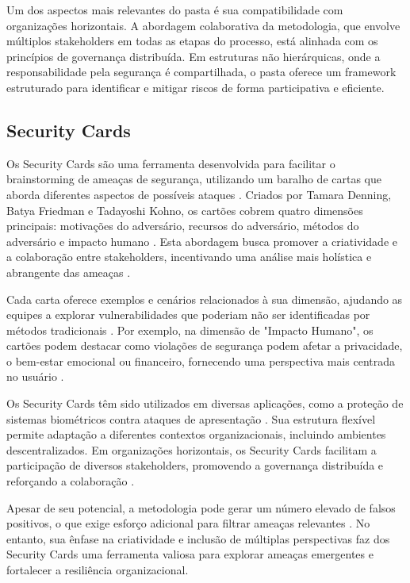 Um dos aspectos mais relevantes do \gls{pasta} é sua compatibilidade com
organizações horizontais. A abordagem colaborativa da metodologia, que
envolve múltiplos stakeholders em todas as etapas do processo, está
alinhada com os princípios de governança distribuída. Em estruturas
não hierárquicas, onde a responsabilidade pela segurança é
compartilhada, o \gls{pasta} oferece um framework estruturado para
identificar e mitigar riscos de forma participativa e eficiente.

\subsection{Security Cards}
\label{subsec:security_cards}

Os Security Cards são uma ferramenta desenvolvida para facilitar o
brainstorming de ameaças de segurança, utilizando um baralho de cartas
que aborda diferentes aspectos de possíveis ataques
\cite{SecurityCardsToolkit}. Criados por Tamara Denning, Batya
Friedman e Tadayoshi Kohno, os cartões cobrem quatro dimensões
principais: motivações do adversário, recursos do adversário, métodos
do adversário e impacto humano \cite{KeepingAheadofOurAdversaries}.
Esta abordagem busca promover a criatividade e a colaboração entre
stakeholders, incentivando uma análise mais holística e abrangente das
ameaças \cite{CyberThreatModeling}.

Cada carta oferece exemplos e cenários relacionados à sua dimensão,
ajudando as equipes a explorar vulnerabilidades que poderiam não ser
identificadas por métodos tradicionais \cite{SecurityCardsToolkit}.
Por exemplo, na dimensão de "Impacto Humano", os cartões podem
destacar como violações de segurança podem afetar a privacidade, o
bem-estar emocional ou financeiro, fornecendo uma perspectiva mais
centrada no usuário \cite{KeepingAheadofOurAdversaries}.

Os Security Cards têm sido utilizados em diversas aplicações, como a
proteção de sistemas biométricos contra ataques de apresentação
\cite{AttackTreesforProtectingBiometric}. Sua estrutura flexível
permite adaptação a diferentes contextos organizacionais, incluindo
ambientes descentralizados. Em organizações horizontais, os Security
Cards facilitam a participação de diversos stakeholders, promovendo a
governança distribuída e reforçando a colaboração
\cite{CyberThreatModeling}.

Apesar de seu potencial, a metodologia pode gerar um número elevado de
falsos positivos, o que exige esforço adicional para filtrar ameaças
relevantes \cite{KeepingAheadofOurAdversaries}. No entanto, sua ênfase
na criatividade e inclusão de múltiplas perspectivas faz dos Security
Cards uma ferramenta valiosa para explorar ameaças emergentes e
fortalecer a resiliência organizacional.

